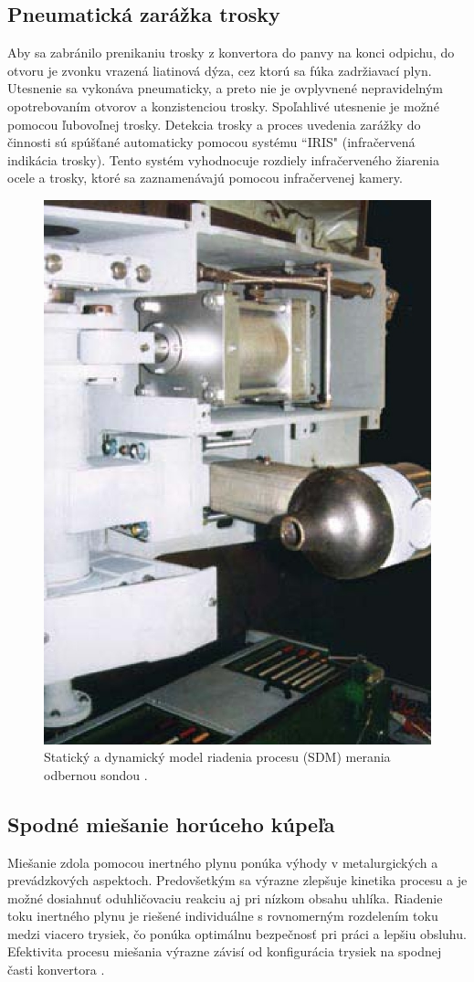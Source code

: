 \documentclass[]{tukediphc}
\begin{document}
\subsection{Pneumatická zarážka trosky}

Aby sa zabránilo prenikaniu trosky z konvertora do panvy na konci odpichu, do otvoru je zvonku vrazená liatinová dýza, cez ktorú sa fúka zadržiavací plyn. Utesnenie sa vykonáva pneumaticky, a preto nie je ovplyvnené nepravidelným opotrebovaním otvorov a konzistenciou trosky. Spoľahlivé utesnenie je možné pomocou ľubovoľnej trosky. Detekcia trosky a proces uvedenia zarážky do činnosti sú spúšťané automaticky pomocou systému ``IRIS" (infračervená indikácia trosky). Tento systém vyhodnocuje rozdiely infračerveného žiarenia ocele a trosky, ktoré sa zaznamenávajú pomocou infračervenej kamery.

\newpage

\begin{figure}[!ht]
	\centering
	\includegraphics[width=.5\textwidth,angle=0]{figures/slag-stopper.jpg}
	\caption{Statický a dynamický model riadenia procesu (SDM) merania odbernou sondou \citep{totalmateria}.}
\end{figure}

\subsection{Spodné miešanie horúceho kúpeľa}

Miešanie zdola pomocou inertného plynu ponúka výhody v metalurgických a prevádzkových aspektoch. Predovšetkým sa výrazne zlepšuje kinetika procesu a je možné dosiahnuť oduhličovaciu reakciu aj pri nízkom obsahu uhlíka. Riadenie toku inertného plynu je riešené individuálne s rovnomerným rozdelením toku medzi viacero trysiek, čo ponúka optimálnu bezpečnosť pri práci a lepšiu obsluhu. Efektivita procesu miešania výrazne závisí od konfigurácia trysiek na spodnej časti konvertora \citep{Choudhary2006}.
\end{document}
